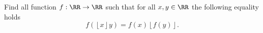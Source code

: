 Find all function $f: \RR \to \RR$ such that for all $x, y \in \RR$ the following equality holds
\[ f(\left\lfloor x\right\rfloor y)=f(x)\left\lfloor f(y)\right\rfloor. \]
